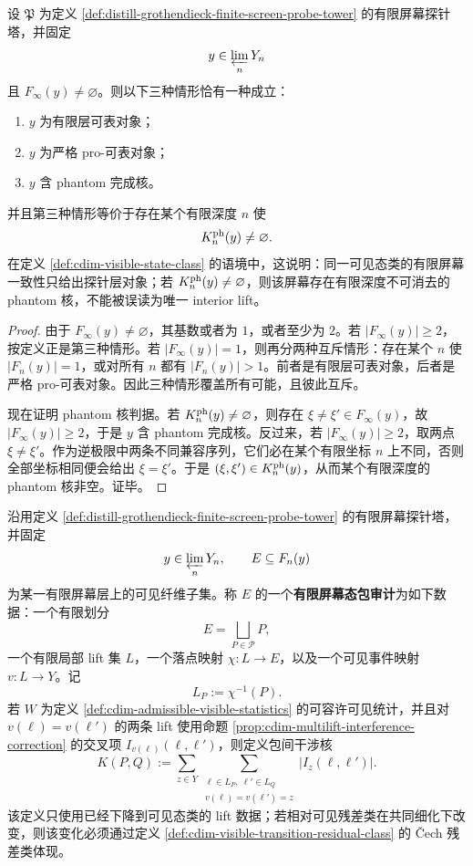\begin{proposition}
\label{prop:distill-grothendieck-finite-screen-probe-trichotomy}
设 \(\mathfrak P\) 为定义 \ref{def:distill-grothendieck-finite-screen-probe-tower} 的有限屏幕探针塔，并固定
\[
y\in\varprojlim_n Y_n
\]
且 \(F_\infty(y)\ne\varnothing\)。则以下三种情形恰有一种成立：
\begin{enumerate}
  \item \(y\) 为有限层可表对象；
  \item \(y\) 为严格 pro-可表对象；
  \item \(y\) 含 phantom 完成核。
\end{enumerate}
并且第三种情形等价于存在某个有限深度 \(n\) 使
\[
K^{\rm ph}_n(y)\ne\varnothing.
\]
在定义 \ref{def:cdim-visible-state-class} 的语境中，这说明：同一可见态类的有限屏幕一致性只给出探针层对象；若 \(K^{\rm ph}_n(y)\ne\varnothing\)，则该屏幕存在有限深度不可消去的 phantom 核，不能被误读为唯一 interior lift。
\end{proposition}
\begin{proof}
由于 \(F_\infty(y)\ne\varnothing\)，其基数或者为 \(1\)，或者至少为 \(2\)。若 \(|F_\infty(y)|\ge2\)，按定义正是第三种情形。若 \(|F_\infty(y)|=1\)，则再分两种互斥情形：存在某个 \(n\) 使 \(|F_n(y)|=1\)，或对所有 \(n\) 都有 \(|F_n(y)|>1\)。前者是有限层可表对象，后者是严格 pro-可表对象。因此三种情形覆盖所有可能，且彼此互斥。

现在证明 phantom 核判据。若 \(K^{\rm ph}_n(y)\ne\varnothing\)，则存在 \(\xi\ne\xi'\in F_\infty(y)\)，故 \(|F_\infty(y)|\ge2\)，于是 \(y\) 含 phantom 完成核。反过来，若 \(|F_\infty(y)|\ge2\)，取两点 \(\xi\ne\xi'\)。作为逆极限中两条不同兼容序列，它们必在某个有限坐标 \(n\) 上不同，否则全部坐标相同便会给出 \(\xi=\xi'\)。于是 \((\xi,\xi')\in K^{\rm ph}_n(y)\)，从而某个有限深度的 phantom 核非空。证毕。
\end{proof}

\begin{definition}[有限屏幕态包的干涉核审计]\label{distill:bourgain-multiscale_decoupling_gates-finite-screen-state-packet-audit}
沿用定义 \ref{def:distill-grothendieck-finite-screen-probe-tower} 的有限屏幕探针塔，并固定
\[
y\in\varprojlim_nY_n,
\qquad
E\subseteq F_n(y)
\]
为某一有限屏幕层上的可见纤维子集。称 \(E\) 的一个\textbf{有限屏幕态包审计}为如下数据：一个有限划分
\[
E=\bigsqcup_{P\in\mathcal P}P,
\]
一个有限局部 lift 集 \(L\)，一个落点映射 \(\chi:L\to E\)，以及一个可见事件映射 \(v:L\to Y\)。记
\[
L_P:=\chi^{-1}(P).
\]
若 \(W\) 为定义 \ref{def:cdim-admissible-visible-statistics} 的可容许可见统计，并且对 \(v(\ell)=v(\ell')
\) 的两条 lift 使用命题 \ref{prop:cdim-multilift-interference-correction} 的交叉项 \(I_{v(\ell)}(\ell,
\ell')\)，则定义包间干涉核
\[
K(P,Q):=\sum_{z\in Y}
\sum_{\substack{\ell\in L_P,\ \ell'\in L_Q\\ v(\ell)=v(\ell')=z}}
\left|I_z(\ell,
\ell')\right|.
\]
该定义只使用已经下降到可见态类的 lift 数据；若相对可见残差类在共同细化下改变，则该变化必须通过定义 \ref{def:cdim-visible-transition-residual-class} 的 \v Cech 残差类体现。
\end{definition}

